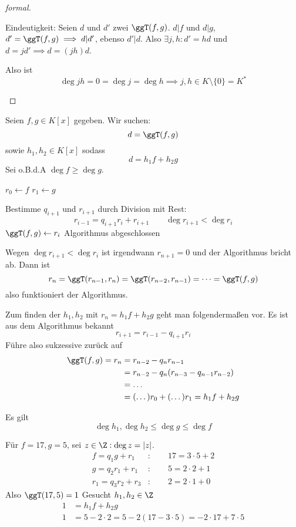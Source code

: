 \documentclass[a4paper, 10pt]{scrbook}
\begin{document}
\begin{prop}
\begin{proof}[formal]
\begin{seg}{Eindeutigkeit:}
Seien $d$ und $d'$ zwei $\ggT(f,g)$.
$d|f$ und $d|g$, $d'=\ggT(f,g) \implies d|d'$, ebenso $d'|d$.
Also $\exists j,h: d'=hd$ und $d=jd' \implies d=(jh)d$.

Also ist
\[
\deg jh = 0 = \deg j = \deg h \implies j,h\in K\setminus \{0\}=K^*
\]
\end{seg}

\end{proof}


\end{prop}

\begin{alg*} 
Seien $f,g\in K[x]$ gegeben.
Wir suchen:
\[
d=\ggT(f,g)
\]
sowie $h_1,h_2\in K[x]$ sodass
\[
	d=h_1f+h_2g
\]
Sei o.B.d.A $\deg f \ge \deg g$.

\begin{algorithmic}
	\State $r_0 \gets f$
	\State $r_1 \gets g$

		\State Bestimme $q_{i+1}$ und $r_{i+1}$ durch Division mit Rest: 
			\[
				r_{i-1} = q_{i+1}r_i + r_{i+1} \qquad \deg r_{i+1} < \deg r_{i}
			\]
			\State $\ggT(f,g) \gets r_i$
			\State Algorithmus abgeschlossen
		\EndIf
	\EndFor
\end{algorithmic}

Wegen $\deg r_{i+1} < \deg r_{i}$ ist irgendwann $r_{n+1} = 0$ und der Algorithmus bricht ab.
Dann ist
\[
	r_{n} = \ggT(r_{n-1},r_{n}) = \ggT(r_{n-2},r_{n-1}) = \dotsb = \ggT(f,g)
\]
also funktioniert der Algorithmus.

Zum finden der $h_1,h_2$ mit $r_n = h_1f + h_2g$ geht man folgendermaßen vor.
Es ist aus dem Algorithmus bekannt
\[
	r_{i+1} = r_{i-1} - q_{i+1}r_i 
\]
Führe also sukzessive zurück auf
\begin{align*}
	\ggT(f,g) = r_n &= r_{n-2} - q_nr_{n-1} \\
					&= r_{n-2} - q_n(r_{n-3} -q_{n-1}r_{n-2})\\
		&= \dotsc\\
	 &= (\dotso)r_0 + (\dotso)r_1 = h_1f + h_2g
\end{align*}

Es gilt 
\[
	\deg h_1,\deg h_2 \le \deg g \le \deg f
\]

\end{alg*}


\begin{ex}
Für $f=17, g=5$, sei $z\in \Z:\deg z=|z|$.
\begin{align*}
f= q_1g+r_1 &: \qquad 17 = 3\cdot 5 + 2\\
g=q_2r_1 +r_1&: \qquad 5 = 2\cdot 2 + 1\\
r_1=q_3r_2+r_3&: \qquad  2 = 2\cdot 1 + 0
\end{align*}
Also $\ggT(17,5)=1$
Gesucht $h_1,h_2\in \Z$
\begin{align*}
1 &=h_1f+h_2g\\
1 &=5-2\cdot 2=5-2(17-3\cdot 5)=- 2 \cdot 17+7 \cdot 5
\end{align*}


\end{ex}
\end{document}
